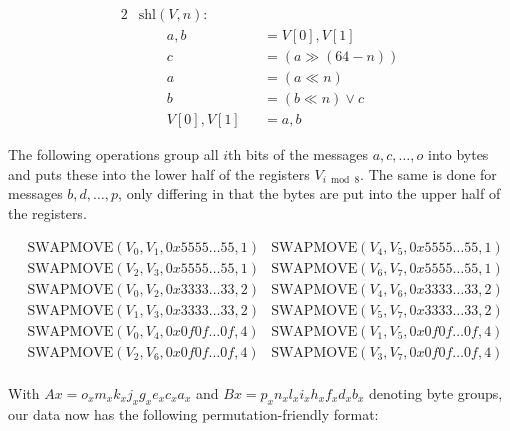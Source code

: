 \documentclass[12pt]{report}
\begin{document}
\begin{alignat*}{2}
    &\text{shl}(V,n): \\
    &\qquad a,b&&=V[0],V[1] \\
    &\qquad c&&=(a\gg (64-n)) \\
    &\qquad a&&=(a\ll n) \\
    &\qquad b&&=(b\ll n)\lor c \\
    &\qquad V[0],V[1]&&=a,b
\end{alignat*}

The following operations group all $i$th bits of the messages $a,c,\dots,o$
into bytes and puts these into the lower half of the registers $V_{i\bmod 8}$.
The same is done for messages $b,d,\dots,p$, only differing in that the bytes
are put into the upper half of the registers.

\begin{align*}
    &\text{SWAPMOVE}(V_0,V_1,0x5555\dots 55,1) &\text{SWAPMOVE}(V_4,V_5,0x5555\dots 55,1) \\
    &\text{SWAPMOVE}(V_2,V_3,0x5555\dots 55,1) &\text{SWAPMOVE}(V_6,V_7,0x5555\dots 55,1) \\
    &\text{SWAPMOVE}(V_0,V_2,0x3333\dots 33,2) &\text{SWAPMOVE}(V_4,V_6,0x3333\dots 33,2) \\
    &\text{SWAPMOVE}(V_1,V_3,0x3333\dots 33,2) &\text{SWAPMOVE}(V_5,V_7,0x3333\dots 33,2) \\
    &\text{SWAPMOVE}(V_0,V_4,0x0f0f\dots 0f,4) &\text{SWAPMOVE}(V_1,V_5,0x0f0f\dots 0f,4) \\
    &\text{SWAPMOVE}(V_2,V_6,0x0f0f\dots 0f,4) &\text{SWAPMOVE}(V_3,V_7,0x0f0f\dots 0f,4) \\
\end{align*}

With $Ax=o_xm_xk_xj_xg_xe_xc_xa_x$ and $Bx=p_xn_xl_xi_xh_xf_xd_xb_x$ denoting
byte groups, our data now has the following permutation-friendly format:
\end{document}
